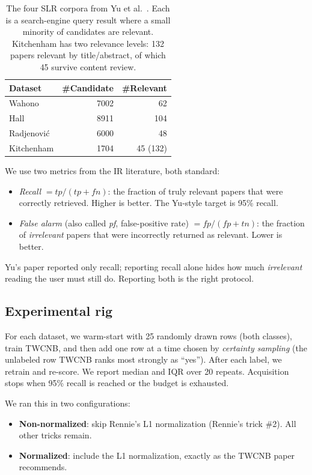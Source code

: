 \documentclass[AMA,STIX2COL]{WileyNJDv5}
\begin{document}
{\begin{table}[!t]
\caption{The four SLR corpora from Yu et al.\
\cite{yu2018finding}. Each is a search-engine query result
where a small minority of candidates are relevant.
Kitchenham has two relevance levels: 132 papers relevant by
title/abstract, of which 45 survive content review.}
\label{slr}
\begin{center}
\footnotesize
\begin{tabular}{lrr}
\hline
Dataset & \#Candidate & \#Relevant \\
\hline
Wahono       & 7002 & 62 \\
Hall         & 8911 & 104 \\
Radjenovi\'c & 6000 & 48 \\
Kitchenham   & 1704 & 45 (132) \\
\hline
\end{tabular}
\end{center}
\end{table}

We use two metrics from the IR literature, both standard:

\begin{itemize}
\item {\em Recall} $= \mathit{tp} / (\mathit{tp} +
\mathit{fn})$: the fraction of truly relevant papers that
were correctly retrieved. Higher is better. The Yu-style
target is 95\% recall.
\item {\em False alarm} (also called {\em pf}, false-positive
rate) $= \mathit{fp} / (\mathit{fp} + \mathit{tn})$: the
fraction of {\em irrelevant} papers that were incorrectly
returned as relevant. Lower is better.
\end{itemize}
Yu's paper reported only recall; reporting recall alone hides
how much {\em irrelevant} reading the user must still do.
Reporting both is the right protocol.

\subsection*{Experimental rig}

For each dataset, we warm-start with 25 randomly drawn rows
(both classes), train TWCNB, and then add one row at a time
chosen by {\em certainty sampling} (the unlabeled row TWCNB
ranks most strongly as ``yes''). After each label, we retrain
and re-score. We report median and IQR over 20 repeats.
Acquisition stops when 95\% recall is reached or the budget
is exhausted.

We ran this in two configurations:
\begin{itemize}
\item {\bf Non-normalized}: skip Rennie's L1 normalization
(Rennie's trick \#2). All other tricks remain.
\item {\bf Normalized}: include the L1 normalization, exactly
as the TWCNB paper recommends.
\end{itemize}

}
\end{document}
